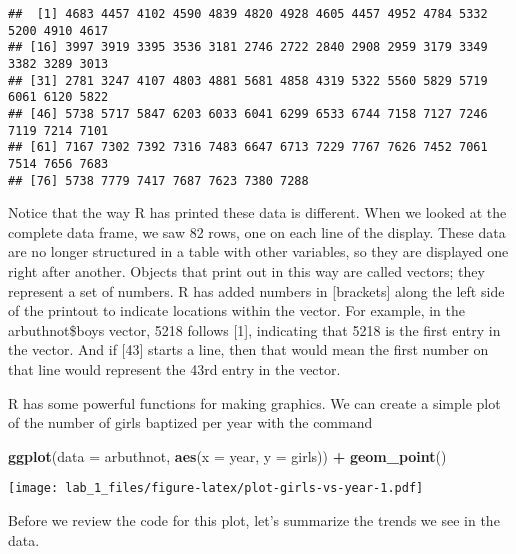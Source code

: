 \documentclass[
]{article}
\newenvironment{Shaded}{\begin{snugshade}}{\end{snugshade}}
\newcommand{\AttributeTok}[1]{\textcolor[rgb]{0.13,0.29,0.53}{#1}}
\newcommand{\FunctionTok}[1]{\textcolor[rgb]{0.13,0.29,0.53}{\textbf{#1}}}
\newcommand{\NormalTok}[1]{#1}
\newcommand{\SpecialCharTok}[1]{\textcolor[rgb]{0.81,0.36,0.00}{\textbf{#1}}}
\begin{document}
\begin{verbatim}
##  [1] 4683 4457 4102 4590 4839 4820 4928 4605 4457 4952 4784 5332 5200 4910 4617
## [16] 3997 3919 3395 3536 3181 2746 2722 2840 2908 2959 3179 3349 3382 3289 3013
## [31] 2781 3247 4107 4803 4881 5681 4858 4319 5322 5560 5829 5719 6061 6120 5822
## [46] 5738 5717 5847 6203 6033 6041 6299 6533 6744 7158 7127 7246 7119 7214 7101
## [61] 7167 7302 7392 7316 7483 6647 6713 7229 7767 7626 7452 7061 7514 7656 7683
## [76] 5738 7779 7417 7687 7623 7380 7288
\end{verbatim}

Notice that the way R has printed these data is different. When we
looked at the complete data frame, we saw 82 rows, one on each line of
the display. These data are no longer structured in a table with other
variables, so they are displayed one right after another. Objects that
print out in this way are called vectors; they represent a set of
numbers. R has added numbers in {[}brackets{]} along the left side of
the printout to indicate locations within the vector. For example, in
the arbuthnot\$boys vector, 5218 follows {[}1{]}, indicating that 5218
is the first entry in the vector. And if {[}43{]} starts a line, then
that would mean the first number on that line would represent the 43rd
entry in the vector.

R has some powerful functions for making graphics. We can create a
simple plot of the number of girls baptized per year with the command

\begin{Shaded}
\begin{Highlighting}[]
\FunctionTok{ggplot}\NormalTok{(}\AttributeTok{data =}\NormalTok{ arbuthnot, }\FunctionTok{aes}\NormalTok{(}\AttributeTok{x =}\NormalTok{ year, }\AttributeTok{y =}\NormalTok{ girls)) }\SpecialCharTok{+}
  \FunctionTok{geom\_point}\NormalTok{()}
\end{Highlighting}
\end{Shaded}

\texttt{[image: lab\_1\_files/figure-latex/plot-girls-vs-year-1.pdf]}

Before we review the code for this plot, let's summarize the trends we
see in the data.
\end{document}
